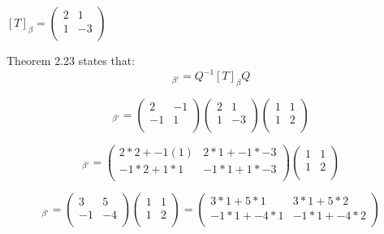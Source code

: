 \documentclass[12pt]{article}
\begin{document}
\begin{enumerate}
    $[T]_\beta = \begin{pmatrix}
        2 & 1 \\
        1 & -3 \\
    \end{pmatrix}$

    Theorem 2.23 states that:
    \begin{equation}
        [T]_{\beta'} = Q^{-1}[T]_{\beta}Q
    \end{equation}

    \begin{equation}
        [T]_{\beta'} = \begin{pmatrix}
        2 & -1\\
        -1 & 1 \\
    \end{pmatrix} \begin{pmatrix}
        2 & 1\\
        1 & -3 \\
    \end{pmatrix} \begin{pmatrix}
        1 & 1 \\
        1 & 2 \\
    \end{pmatrix}  
    \end{equation}

    \begin{equation}
        [T]_{\beta'} = \begin{pmatrix}
            2 * 2 + -1(1) & 2 * 1 + -1 * -3 \\
            -1 * 2 + 1 * 1 & -1 * 1+ 1 * -3 \\
        \end{pmatrix} \begin{pmatrix}
        1 & 1 \\
        1 & 2 \\
    \end{pmatrix}    
    \end{equation}

    \begin{equation}
        [T]_{\beta'} = \begin{pmatrix}
            3 & 5\\
            -1 & -4 \\
        \end{pmatrix} \begin{pmatrix}
        1 & 1 \\
        1 & 2 \\
    \end{pmatrix} = \begin{pmatrix}
        3 * 1 + 5 * 1 & 3 * 1 + 5 * 2 \\
        -1* 1 + -4 * 1 & -1* 1+ -4 * 2 \\
    \end{pmatrix} 
    \end{equation}


\end{enumerate}
\end{document}
